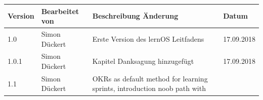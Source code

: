 \documentclass[
  ngerman,
  paper=a4,
,captions=tableheading
]{scrartcl}
\begin{document}
\begin{longtable}[]{@{}llll@{}}
\toprule
\begin{minipage}[b]{0.06\columnwidth}\raggedright
Version\strut
\end{minipage} & \begin{minipage}[b]{0.19\columnwidth}\raggedright
Bearbeitet von\strut
\end{minipage} & \begin{minipage}[b]{0.53\columnwidth}\raggedright
Beschreibung Änderung\strut
\end{minipage} & \begin{minipage}[b]{0.11\columnwidth}\raggedright
Datum\strut
\end{minipage}\tabularnewline
\midrule
\endhead
\begin{minipage}[t]{0.06\columnwidth}\raggedright
1.0\strut
\end{minipage} & \begin{minipage}[t]{0.19\columnwidth}\raggedright
Simon Dückert\strut
\end{minipage} & \begin{minipage}[t]{0.53\columnwidth}\raggedright
Erste Version des lernOS Leitfadens\strut
\end{minipage} & \begin{minipage}[t]{0.11\columnwidth}\raggedright
17.09.2018\strut
\end{minipage}\tabularnewline
\begin{minipage}[t]{0.06\columnwidth}\raggedright
1.0.1\strut
\end{minipage} & \begin{minipage}[t]{0.19\columnwidth}\raggedright
Simon Dückert\strut
\end{minipage} & \begin{minipage}[t]{0.53\columnwidth}\raggedright
Kapitel Danksagung hinzugefügt\strut
\end{minipage} & \begin{minipage}[t]{0.11\columnwidth}\raggedright
17.09.2018\strut
\end{minipage}\tabularnewline
\begin{minipage}[t]{0.06\columnwidth}\raggedright
1.1\strut
\end{minipage} & \begin{minipage}[t]{0.19\columnwidth}\raggedright
Simon Dückert\strut
\end{minipage} & \begin{minipage}[t]{0.53\columnwidth}\raggedright
OKRs as default method for learning sprints, introduction noob path with

\end{minipage}
\end{longtable}
\end{document}
